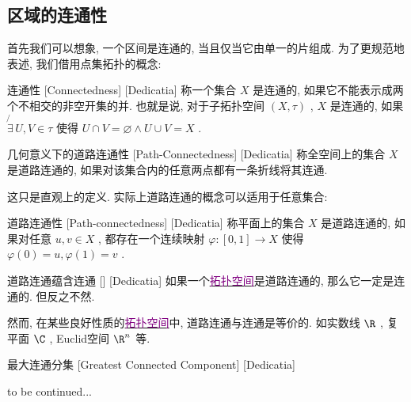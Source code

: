 \documentclass[UTF8]{ctexart}
\newcommand{\hyperrefc}[2]{\hyperref[#1]{\textcolor{purple}{#2}}}
\newcommand{\continued}{{\Large to be continued...}}
\begin{document}
\subsection{区域的连通性}
首先我们可以想象, 一个区间是连通的, 当且仅当它由单一的片组成. 为了更规范地表述, 我们借用点集拓扑的概念:
\begin{dfn}
    [UUID]
    {连通性}
    [Connectedness]
    [Dedicatia]
    称一个集合 \( X \) 是连通的, 如果它不能表示成两个不相交的非空开集的并. 也就是说, 对于子拓扑空间 \( (X,\tau) \) ,  \( X \) 是连通的, 如果 \( \not{\exists}\,U,V\in\tau \) 使得 \( U\cap V=\varnothing\land U\cup V=X \) .
\end{dfn}
\begin{dfn}
    [UUID]
    {几何意义下的道路连通性}
    [Path-Connectedness]
    [Dedicatia]
    称全空间上的集合 \( X \) 是道路连通的, 如果对该集合内的任意两点都有一条折线将其连通. 
\end{dfn}
这只是直观上的定义. 实际上道路连通的概念可以适用于任意集合: 
\begin{dfn}
    [UUID]
    {道路连通性}
    [Path-connectedness]
    [Dedicatia]
    称平面上的集合 \( X \) 是道路连通的, 如果对任意 \( u,v\in X \) , 都存在一个连续映射 \( \varphi:[0,1]\to X \) 使得 \( \varphi(0)=u, \varphi(1)=v \) .
\end{dfn}
\begin{thm}
    [UUID]
    {道路连通蕴含连通}
    []
    [Dedicatia]
    如果一个\hyperrefc{dfn:TopologicalSpace}{拓扑空间}是道路连通的, 那么它一定是连通的. 但反之不然. 
\end{thm}
然而, 在某些良好性质的\hyperrefc{dfn:TopologicalSpace}{拓扑空间}中, 道路连通与连通是等价的. 如实数线 \( \R \) , 复平面 \( \C \) , Euclid空间 \( \R^n \) 等. 
\begin{dfn}
    [UUID]
    {最大连通分集}
    [Greatest Connected Component]
    [Dedicatia]
\end{dfn}
\continued
\end{document}
